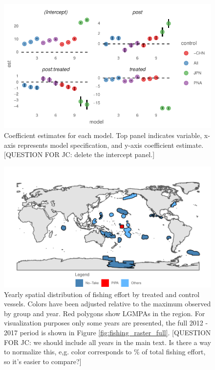\documentclass[11pt,english]{article}
\begin{document}
\begin{figure}
\centering
\includegraphics{Manuscript_files/figure-latex/unnamed-chunk-12-1.pdf}
\caption{\label{fig:unnamed-chunk-12}\label{fig:long}Coefficient estimates
for each model. Top panel indicates variable, x-axis represents model
specification, and y-axis coefficient estimate. [QUESTION FOR JC: delete the intercept panel.]}
\end{figure}

\begin{figure}
\centering
\includegraphics{Manuscript_files/figure-latex/unnamed-chunk-13-1.pdf}
\caption{\label{fig:unnamed-chunk-13}\label{fig:fishing_raster}Yearly
spatial distribution of fishing effort by treated and control vessels.
Colors have been adjusted relative to the maximum observed by group and
year. Red polygons show LGMPAs in the region. For visualization purposes
only some years are presented, the full 2012 - 2017 period is shown in
Figure \ref{fig:fishing_raster_full}. [QUESTION FOR JC: we should include all years in the main text. Is there a way to normalize this, e,g. color corresponds to \% of total fishing effort, so it's easier to compare?]}
\end{figure}
\end{document}
